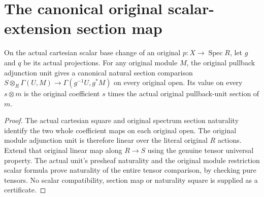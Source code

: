 \section{The canonical original scalar-extension section map}

\begin{lemma}
\label{lem:fc-scheme-module-flat-base-change-map}
\leanok
{}
On the actual cartesian scalar base change of an original
$p:X\to\operatorname{Spec}R$, let $g$ and $q$ be its actual projections.
For any original module $M$, the original pullback adjunction unit gives
a canonical natural section comparison
$S\otimes_R\Gamma(U,M)\to\Gamma(g^{-1}U,g^*M)$ on every original open.
Its value on every $s\otimes m$ is the original coefficient $s$ times
the actual original pullback-unit section of $m$.
\end{lemma}
\begin{proof}
The actual cartesian square and original spectrum section naturality
identify the two whole coefficient maps on each original open. The
original module adjunction unit is therefore linear over the literal
original $R$ actions. Extend that original linear map along $R\to S$
using the genuine tensor universal property. The actual unit's
presheaf naturality and the original module restriction scalar formula
prove naturality of the entire tensor comparison, by checking pure
tensors. No scalar compatibility, section map or naturality square is
supplied as a certificate.
\end{proof}
